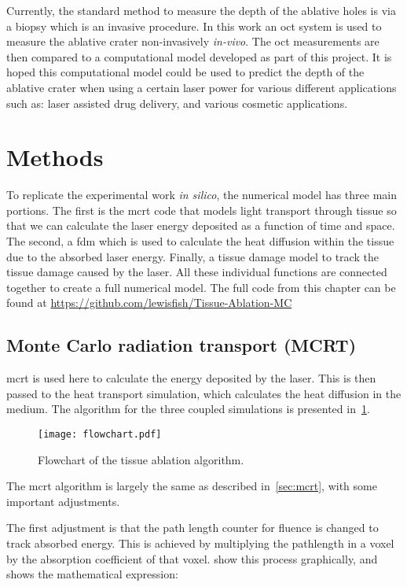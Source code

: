 Currently, the standard method to measure the depth of the ablative holes is via a biopsy which is an invasive procedure. In this work an \gls*{oct} system is used to measure the ablative crater non-invasively \textit{in-vivo}. The \gls*{oct} measurements are then compared to a computational model developed as part of this project. It is hoped this computational model could be used to predict the depth of the ablative crater when using a certain laser power for various different applications such as: laser assisted drug delivery, and various cosmetic applications.


\section{Methods}

To replicate the experimental work \textit{in silico}, the numerical model has three main portions. The first is the \gls*{mcrt} code that models light transport through tissue so that we can calculate the laser energy deposited as a function of time and space. The second, a \gls*{fdm} which is used to calculate the heat diffusion within the tissue due to the absorbed laser energy. Finally, a tissue damage model to track the tissue damage caused by the laser. All these individual functions are connected together to create a full numerical model.
The full code from this chapter can be found at \url{https://github.com/lewisfish/Tissue-Ablation-MC}

\subsection{Monte Carlo radiation transport (MCRT)}

\gls*{mcrt} is used here to calculate the energy deposited by the laser. This is then passed to the heat transport simulation, which calculates the heat diffusion in the medium. The algorithm for the three coupled simulations is presented in~\cref{fig:algoablation}.

\begin{figure}[!htbp]
\centering
\texttt{[image: flowchart.pdf]}
\caption{Flowchart of the tissue ablation algorithm.}
\label{fig:algoablation}
\end{figure}

The \gls*{mcrt} algorithm is largely the same as described in~\cref{sec:mcrt}, with some important adjustments.

The first adjustment is that the path length counter for fluence is changed to track absorbed energy. This is achieved by multiplying the pathlength in a voxel by the absorption coefficient of that voxel.  show this process graphically, and  shows the mathematical expression:

